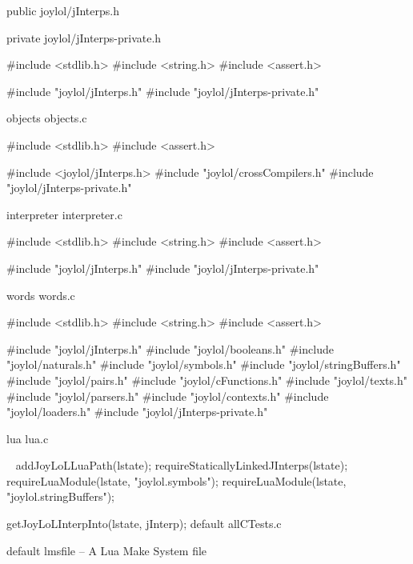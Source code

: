 \createCHeaderFile%
  {public}%
  {joylol/jInterps.h}%
  {}

\createCHeaderFile%
  {private}%
  {joylol/jInterps-private.h}%
  {}

\startCCode
#include <stdlib.h>
#include <string.h>
#include <assert.h>

#include "joylol/jInterps.h"
#include "joylol/jInterps-private.h"
\stopCCode

\createCCodeFile%
  {objects}%
  {objects.c}%
  {}

\startCCode
#include <stdlib.h>
#include <assert.h>

#include <joylol/jInterps.h>
#include "joylol/crossCompilers.h"
#include "joylol/jInterps-private.h"
\stopCCode

\createCCodeFile%
  {interpreter}%
  {interpreter.c}%
  {}

\startCCode
#include <stdlib.h>
#include <string.h>
#include <assert.h>

#include "joylol/jInterps.h"
#include "joylol/jInterps-private.h"
\stopCCode

\createCCodeFile%
  {words}%
  {words.c}%
  {}

\startCCode
#include <stdlib.h>
#include <string.h>
#include <assert.h>

#include "joylol/jInterps.h"
#include "joylol/booleans.h"
#include "joylol/naturals.h"
#include "joylol/symbols.h"
#include "joylol/stringBuffers.h"
#include "joylol/pairs.h"
#include "joylol/cFunctions.h"
#include "joylol/texts.h"
#include "joylol/parsers.h"
#include "joylol/contexts.h"
#include "joylol/loaders.h"
#include "joylol/jInterps-private.h"
\stopCCode

\createCCodeFile%
  {lua}%
  {lua.c}%
  {}

\CTestsSetup\
\startCTest
  addJoyLoLLuaPath(lstate);
  requireStaticallyLinkedJInterps(lstate);
  requireLuaModule(lstate, "joylol.symbols");
  requireLuaModule(lstate, "joylol.stringBuffers");
  
  getJoyLoLInterpInto(lstate, jInterp);
\stopCTest
\createCTestFile%
  {default}%
  {allCTests.c}%
  {}





\createLmsfileFile%
  {default}%
  {lmsfile}%
  {-- A Lua Make System file}

